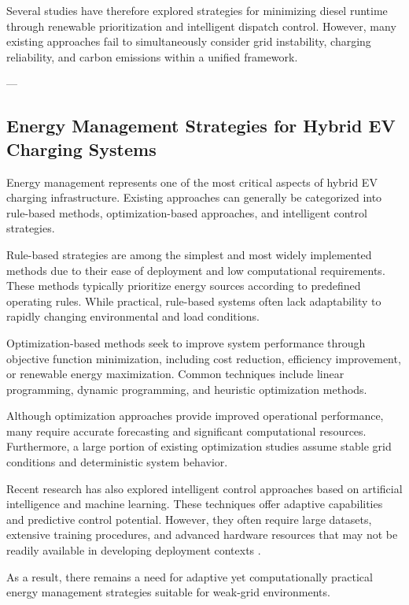 Several studies have therefore explored strategies for minimizing diesel runtime through renewable prioritization and intelligent dispatch control. However, many existing approaches fail to simultaneously consider grid instability, charging reliability, and carbon emissions within a unified framework.

---

\subsection{Energy Management Strategies for Hybrid EV Charging Systems}

Energy management represents one of the most critical aspects of hybrid EV charging infrastructure. Existing approaches can generally be categorized into rule-based methods, optimization-based approaches, and intelligent control strategies.

Rule-based strategies are among the simplest and most widely implemented methods due to their ease of deployment and low computational requirements. These methods typically prioritize energy sources according to predefined operating rules. While practical, rule-based systems often lack adaptability to rapidly changing environmental and load conditions.

Optimization-based methods seek to improve system performance through objective function minimization, including cost reduction, efficiency improvement, or renewable energy maximization. Common techniques include linear programming, dynamic programming, and heuristic optimization methods.

Although optimization approaches provide improved operational performance, many require accurate forecasting and significant computational resources. Furthermore, a large portion of existing optimization studies assume stable grid conditions and deterministic system behavior.

Recent research has also explored intelligent control approaches based on artificial intelligence and machine learning. These techniques offer adaptive capabilities and predictive control potential. However, they often require large datasets, extensive training procedures, and advanced hardware resources that may not be readily available in developing deployment contexts \cite{energy_management_ev}.

As a result, there remains a need for adaptive yet computationally practical energy management strategies suitable for weak-grid environments.

